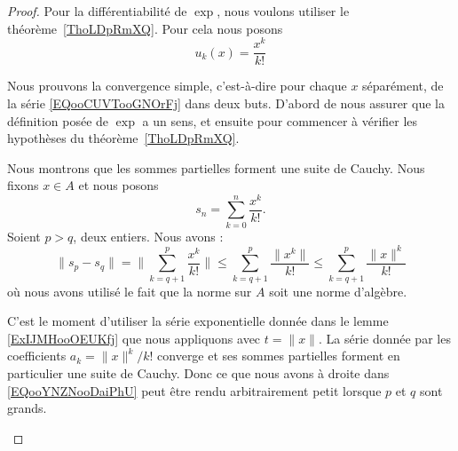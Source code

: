 \begin{proof}
	Pour la différentiabilité de \( \exp\), nous voulons utiliser le théorème~\ref{ThoLDpRmXQ}. Pour cela nous posons
	\begin{equation}
		u_k(x)=\frac{ x^k }{ k! }
	\end{equation}

	\begin{subproof}
		Nous prouvons la convergence simple, c'est-à-dire pour chaque \( x\) séparément, de la série \eqref{EQooCUVTooGNOrFj} dans deux buts. D'abord de nous assurer que la définition posée de \( \exp\) a un sens, et ensuite pour commencer à vérifier les hypothèses du théorème~\ref{ThoLDpRmXQ}.

		Nous montrons que les sommes partielles forment une suite de Cauchy. Nous fixons \( x\in A\) et nous posons
		\begin{equation}
			s_n=\sum_{k=0}^{n}\frac{ x^k }{ k! }.
		\end{equation}
		Soient \( p>q\), deux entiers. Nous avons :
		\begin{equation}        \label{EQooYNZNooDaiPhU}
			\| s_p-s_q \|=\| \sum_{k=q+1}^p\frac{ x^k }{ k! } \|\leq \sum_{k=q+1}^p\frac{ \| x^k \| }{ k! }\leq \sum_{k=q+1}^p\frac{ \| x \|^k }{ k! }
		\end{equation}
		où nous avons utilisé le fait que la norme sur \( A\) soit une norme d'algèbre.

		C'est le moment d'utiliser la série exponentielle donnée dans le lemme \ref{ExIJMHooOEUKfj} que nous appliquons avec \( t=\| x \|\). La série donnée par les coefficients \( a_k=\| x \|^k/k!\) converge et ses sommes partielles forment en particulier une suite de Cauchy. Donc ce que nous avons à droite dans \eqref{EQooYNZNooDaiPhU} peut être rendu arbitrairement petit lorsque \( p\) et \( q\) sont grands.


\end{subproof}
\end{proof}
